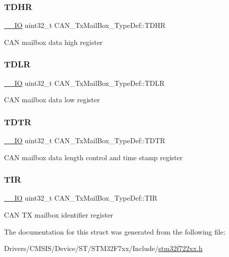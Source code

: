 \subsubsection{\texorpdfstring{TDHR}{TDHR}}
{\footnotesize\ttfamily \mbox{\hyperlink{core__sc300_8h_aec43007d9998a0a0e01faede4133d6be}{\+\_\+\+\_\+\+IO}} uint32\+\_\+t C\+A\+N\+\_\+\+Tx\+Mail\+Box\+\_\+\+Type\+Def\+::\+T\+D\+HR}

C\+AN mailbox data high register \mbox{\label{struct_c_a_n___tx_mail_box___type_def_a408c96501b1cc8bd527432736d132a39}} 
\subsubsection{\texorpdfstring{TDLR}{TDLR}}
{\footnotesize\ttfamily \mbox{\hyperlink{core__sc300_8h_aec43007d9998a0a0e01faede4133d6be}{\+\_\+\+\_\+\+IO}} uint32\+\_\+t C\+A\+N\+\_\+\+Tx\+Mail\+Box\+\_\+\+Type\+Def\+::\+T\+D\+LR}

C\+AN mailbox data low register \mbox{\label{struct_c_a_n___tx_mail_box___type_def_a2351cb865d064cf75f61642aaa887f76}} 
\subsubsection{\texorpdfstring{TDTR}{TDTR}}
{\footnotesize\ttfamily \mbox{\hyperlink{core__sc300_8h_aec43007d9998a0a0e01faede4133d6be}{\+\_\+\+\_\+\+IO}} uint32\+\_\+t C\+A\+N\+\_\+\+Tx\+Mail\+Box\+\_\+\+Type\+Def\+::\+T\+D\+TR}

C\+AN mailbox data length control and time stamp register \mbox{\label{struct_c_a_n___tx_mail_box___type_def_a22f525c909de2dcec1d4093fe1d562b8}} 
\subsubsection{\texorpdfstring{TIR}{TIR}}
{\footnotesize\ttfamily \mbox{\hyperlink{core__sc300_8h_aec43007d9998a0a0e01faede4133d6be}{\+\_\+\+\_\+\+IO}} uint32\+\_\+t C\+A\+N\+\_\+\+Tx\+Mail\+Box\+\_\+\+Type\+Def\+::\+T\+IR}

C\+AN TX mailbox identifier register 

The documentation for this struct was generated from the following file\+:\begin{DoxyCompactItemize}
\item 
Drivers/\+C\+M\+S\+I\+S/\+Device/\+S\+T/\+S\+T\+M32\+F7xx/\+Include/\mbox{\hyperlink{stm32f722xx_8h}{stm32f722xx.\+h}}\end{DoxyCompactItemize}
